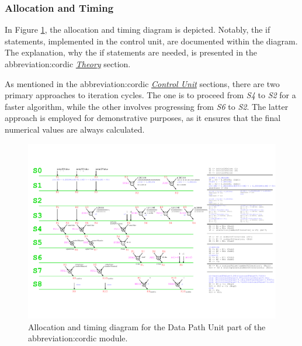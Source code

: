 \documentclass[a4paper, twoside, 11pt]{article}
\newcommand{\fbar}{\FloatBarrier}
\begin{document}
        \subsubsection{Allocation and Timing}
            In Figure \ref{fig:cordic-allocation-timing}, the allocation and timing diagram is depicted. Notably, the if statements, implemented in the control unit, are documented within the diagram. The explanation, why the if statements are needed, is presented in the \gls{abbreviation:cordic} \hyperref[subsec:cordic-theory]{\textit{Theory}} section.\par
            As mentioned in the \gls{abbreviation:cordic} \hyperref[subsubsec:cordic-control-unit]{\textit{Control Unit}} sections, there are two primary approaches to iteration cycles. The one is to proceed from \textit{S4} to \textit{S2} for a faster algorithm, while the other involves progressing from \textit{S6} to \textit{S2}. The latter approach is employed for demonstrative purposes, as it ensures that the final numerical values are always calculated.
            \begin{figure}[htbp!]
                \centering
                \includegraphics[width=1\textwidth]{src/pdf/cordic-allocation-timing.pdf}
                \caption{Allocation and timing diagram for the Data Path Unit part of the \gls{abbreviation:cordic} module.}
                \label{fig:cordic-allocation-timing}
            \end{figure}
        \fbar
\end{document}
